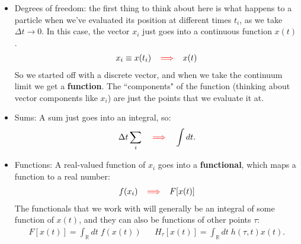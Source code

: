\documentclass[12pt, oneside]{article}   	%
\theoremstyle{definition}
\begin{document}
\begin{itemize}
	
	\item Degrees of freedom: the first thing to think about here is what happens to a particle when we've evaluated its position at different times $t_i$, as we take $\Delta t\rightarrow 0$. In this case, the vector $x_i$ just goes into a continuous function $x(t)$. 
	\begin{align}
		x_i\equiv x(t_i) \;\;\; {\color{red} \implies}\;\;\;  x(t) %
	\end{align}
	So we started off with a discrete vector, and when we take the continuum limit we get a \textbf{function}. The ``components" of the function (thinking about vector components like $x_i$) are just the points that we evaluate it at. 
	
	\item Sums: A sum just goes into an integral, so:
	\begin{align}
		\Delta t \sum_i \;\;\; {\color{red} \implies}\;\;\; \int dt. %
	\end{align}
	
	\item Functions: A real-valued function of $x_i$ goes into a \textbf{functional}, which maps a function to a real number:
	\begin{align}
		f(x_i)\;\;\; {\color{red} \implies}\;\;\;  F[x(t)] %
	\end{align}
	The functionals that we work with will generally be an integral of some function of $x(t)$, and they can also be functions of other points $\tau$:
	\begin{align}
		F[x(t)] = \int_{\mathbb R} dt\; f(x(t)) && H_\tau[x(t)] = \int_{\mathbb{R}}dt\; h(\tau, t) x(t).
	\end{align}
	

\end{itemize}
\end{document}
